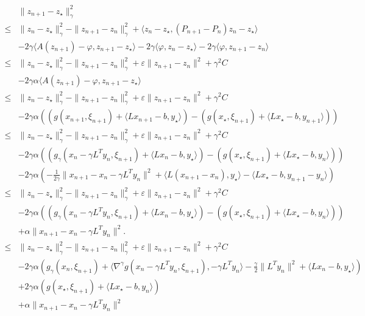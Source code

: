 \documentclass{article}
\newcommand{\1}{\mathbbm 1}
\newcommand{\ps}[1]{\langle #1 \rangle}
\theoremstyle{definition}
\begin{document}
\begin{align*}
&\|z_{n+1} - z_\star\|_\gamma^2 \\
\leq &\|z_{n} - z_\star\|_\gamma^2 - \|z_{n+1} - z_{n}\|_\gamma^2 + \ps{z_n - z_\star,(P_{n+1} - P_n)z_n - z_\star}\\
& -2\gamma \ps{A(z_{n+1}) - \varphi,z_{n+1} - z_\star} -2\gamma \ps{\varphi,z_{n} - z_\star} -2\gamma \ps{\varphi,z_{n+1} - z_n}\\
\leq &\|z_{n} - z_\star\|_\gamma^2 - \|z_{n+1} - z_{n}\|_\gamma^2 +  \varepsilon \|z_{n+1} - z_{n}\|^2 + \gamma^2 C\\
& -2\gamma \alpha \ps{A(z_{n+1}) - \varphi,z_{n+1} - z_\star} \\
\leq &\|z_{n} - z_\star\|_\gamma^2 - \|z_{n+1} - z_{n}\|_\gamma^2 +  \varepsilon \|z_{n+1} - z_{n}\|^2 + \gamma^2 C\\
& -2\gamma\alpha \left(( g(x_{n+1},\xi_{n+1}) + \ps{L x_{n+1} - b,y_\star} ) - ( g(x_\star,\xi_{n+1}) + \ps{L x_\star - b,y_{n+1}} )\right)\\
\leq &\|z_{n} - z_\star\|_\gamma^2 - \|z_{n+1} - z_{n}\|_\gamma^2 +  \varepsilon \|z_{n+1} - z_{n}\|^2 + \gamma^2 C\\
& -2\gamma\alpha \left(( g_\gamma(x_{n} - \gamma L^T y_{n},\xi_{n+1}) + \ps{L x_{n}-b,y_\star} ) - ( g(x_\star,\xi_{n+1}) + \ps{L x_\star-b,y_{n}} )\right)\\
& -2\gamma\alpha \left(-\frac{1}{2\gamma}\|x_{n+1} - x_n - \gamma L^T y_n\|^2 + \ps{L (x_{n+1} - x_n),y_\star} - \ps{L x_\star - b,y_{n+1} - y_n}\right)\\
\leq &\|z_{n} - z_\star\|_\gamma^2 - \|z_{n+1} - z_{n}\|_\gamma^2 + \varepsilon \|z_{n+1} - z_{n}\|^2 + \gamma^2 C \\
& -2\gamma\alpha \left(( g_\gamma(x_{n} - \gamma L^T y_{n},\xi_{n+1}) + \ps{L x_{n}-b,y_\star} ) - ( g(x_\star,\xi_{n+1}) + \ps{L x_\star-b,y_{n}} )\right)\\
& + \alpha\|x_{n+1} - x_n - \gamma L^T y_n\|^2.\\
\leq &\|z_{n} - z_\star\|_\gamma^2 - \|z_{n+1} - z_{n}\|_\gamma^2 + \varepsilon \|z_{n+1} - z_{n}\|^2 + \gamma^2 C \\
& -2\gamma\alpha \left( g_\gamma(x_{n},\xi_{n+1}) + \ps{\nabla^\gamma g(x_n-\gamma L^T y_n,\xi_{n+1}), -\gamma L^T y_n} - \frac{\gamma}{2}\|L^T y_n\|^2 + \ps{L x_{n}-b,y_\star} \right) \\
& +2\gamma \alpha \left( g(x_\star,\xi_{n+1}) + \ps{L x_\star -b,y_{n}} \right)\\
& + \alpha\|x_{n+1} - x_n - \gamma L^T y_n\|^2\\

\end{align*}
\end{document}
